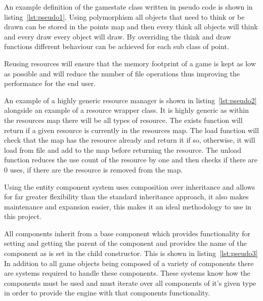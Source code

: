 \documentclass[11pt,a4paper,titlepage]{report}
\begin{document}
	An example definition of the gamestate class written in pseudo code is shown in listing~\ref{lst:pseudo1}. Using polymorphism all objects that need to think or be drawn can be stored in the points map and then every think all objects will think and every draw every object will draw. By overriding the think and draw functions different behaviour can be achieved for each sub class of point.

	Reusing resources will ensure that the memory footprint of a game is kept as low as possible and will reduce the number of file operations thus improving the performance for the end user.

	

	An example of a highly generic resource manager is shown in listing~\ref{lst:pseudo2} alongside an example of a resource wrapper class. It is highly generic as within the resources map there will be all types of resource. The exists function will return if a given resource is currently in the resources map. The load function will check that the map has the resource already and return it if so, otherwise, it will load from file and add to the map before returning the resource. The unload function reduces the use count of the resource by one and then checks if there are 0 uses, if there are the resource is removed from the map.


	Using the entity component system uses composition over inheritance and allows for far greater flexibility than the standard inheritance approach, it also makes maintenance and expansion easier, this makes it an ideal methodology to use in this project.

	

	All components inherit from a base component which provides functionality for setting and getting the parent of the component and provides the name of the component as is set in the child constructor. This is shown in listing~\ref{lst:pseudo3} In addition to all game objects being composed of a variety of components there are systems required to handle these components. These systems know how the components must be used and must iterate over all components of it's given type in order to provide the engine with that components functionality.
\end{document}
